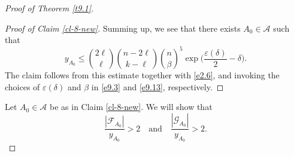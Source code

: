 \documentclass[10pt]{amsart}
\theoremstyle{remark}
\newcommand{\mik}{\leqslant}
\newcommand{\Fcal}{\mathcal{F}}
\newcommand{\Gcal}{\mathcal{G}}
\newcommand{\Acal}{\mathcal{A}}
\begin{document}
\begin{proof}[Proof of Theorem \emph{\ref{t9.1}}]
\begin{proof}[Proof of Claim \emph{\ref{cl-8-new}}]
Summing up, we see that there exists $A_0\in\Acal$ such that
\begin{equation} \label{en9.10}
y_{A_0}\mik \binom{2\ell}{\ell}\binom{n-2\ell}{k-\ell} \binom{n}{\beta}^5
\exp\Big(\frac{\varepsilon(\delta)}{2}-\delta\Big).
\end{equation}
The claim follows from this estimate together with \eqref{e2.6}, and invoking the choices of
$\varepsilon(\delta)$ and $\beta$ in \eqref{e9.3} and \eqref{e9.13}, respectively.
\end{proof}
Let $A_0\in\mathcal{A}$ be as in Claim \ref{cl-8-new}. We will show that
%
\begin{equation} \label{e9.17}
\frac{|\Fcal_{A_0}|}{y_{A_0}}>2 \ \ \ \text{ and } \ \ \ \frac{|\Gcal_{A_0}|}{y_{A_0}}>2.
\end{equation}

\end{proof}
\end{document}
